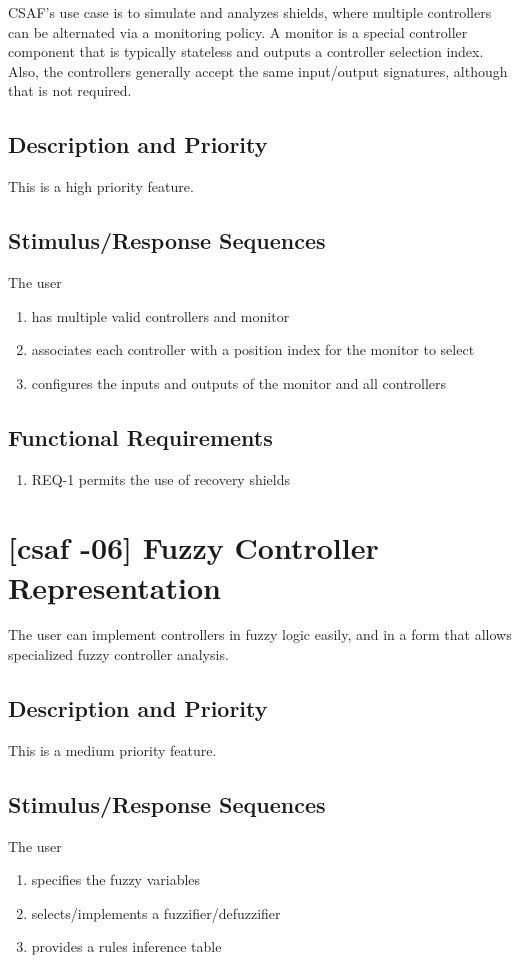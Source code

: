 CSAF's use case is to simulate and analyzes shields, where multiple controllers can be alternated via a monitoring policy. A monitor is a special controller component that is typically stateless and outputs a controller selection index. Also, the controllers generally accept the same input/output signatures, although that is not required. 

\subsection{Description and Priority}
This is a high priority feature.

\subsection{Stimulus/Response Sequences}
The user
\begin{enumerate}
\item has multiple valid controllers and monitor
\item associates each controller with a position index for the monitor to select 
\item  configures the inputs and outputs of the monitor and all controllers
\end{enumerate}

\subsection{Functional Requirements}
\begin{enumerate}
\item REQ-1 \quad permits the use of recovery shields
\end{enumerate}

\section{[\acrshort{csaf} -06] Fuzzy Controller Representation}

The user can implement controllers in fuzzy logic easily, and in a form that allows specialized fuzzy controller analysis. 

\subsection{Description and Priority}
This is a medium priority feature.

\subsection{Stimulus/Response Sequences}
The user
\begin{enumerate}
\item specifies the fuzzy variables
\item selects/implements a fuzzifier/defuzzifier
\item provides a rules inference table
\end{enumerate}

